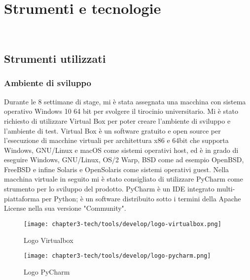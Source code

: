 
\chapter{Strumenti e tecnologie}
\label{cap:strumenti-e-tecnologie}

\\

\section{Strumenti utilizzati}

\subsection{Ambiente di sviluppo}
Durante le 8 settimane di stage, mi è stata assegnata una macchina con sistema operativo Windows 10 64 bit per svolgere il tirocinio universitario. Mi è stato richiesto di utilizzare Virtual Box per poter creare l'ambiente di sviluppo e l'ambiente di test. Virtual Box è un software gratuito e open source per l'esecuzione di macchine virtuali per architettura x86 e 64bit che supporta Windows, GNU/Linux e macOS come sistemi operativi host, ed è in grado di eseguire Windows, GNU/Linux, OS/2 Warp, BSD come ad esempio OpenBSD, FreeBSD e infine Solaris e OpenSolaris come sistemi operativi guest.\newline{}
Nella macchina virtuale in seguito mi è stato consigliato di utilizzare PyCharm come strumento per lo sviluppo del prodotto. PyCharm è un IDE integrato multi-piattaforma per Python; è un software distribuito sotto i termini della Apache License nella sua versione "Community".
\begin{figure}[!h]
    \begin{minipage}{.5\textwidth} 
        \centering 
        \texttt{[image: chapter3-tech/tools/develop/logo-virtualbox.png]} 
        \caption{Logo Virtualbox} 
        \label{fig:virtualbox} 
    \end{minipage}%
    \begin{minipage}{.5\textwidth} 
        \centering 
        \texttt{[image: chapter3-tech/tools/develop/logo-pycharm.png]} 
        \caption{Logo PyCharm} 
        \label{fig:pycharm} 
    \end{minipage}  
\end{figure}

